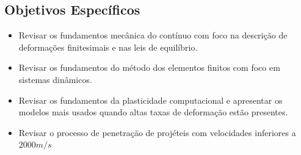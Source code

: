 \subsection{Objetivos Específicos}

\begin{itemize}
    \item Revisar os fundamentos mecânica do contínuo com foco na descrição de deformações finitesimais e nas leis de equilíbrio.
    \item Revisar os fundamentos do método dos elementos finitos com foco em sistemas dinâmicos.
    \item Revisar os fundamentos da plasticidade computacional e apresentar os modelos mais usados quando altas taxas de deformação estão presentes.
    \item Revisar o processo de penetração de projéteis com velocidades inferiores a $2000 m/s$
\end{itemize}